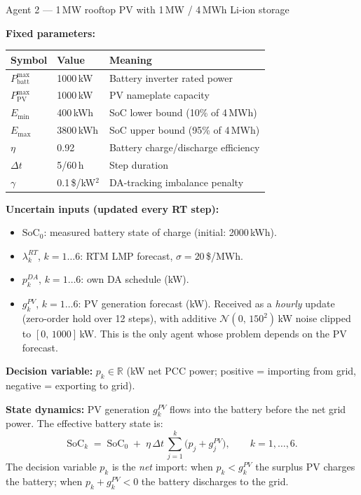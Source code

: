 \documentclass[11pt, letterpaper]{article}
\newcommand{\Dt}{\Delta t}
\begin{document}
\begin{agentbox}{Agent 2 — 1\,MW rooftop PV with 1\,MW / 4\,MWh Li-ion storage}

\textbf{Fixed parameters:}
\begin{center}
\small
\begin{tabular}{lll}
\toprule
Symbol & Value & Meaning \\
\midrule
$P^{\max}_{\text{batt}}$ & 1000\,kW & Battery inverter rated power \\
$P^{\max}_{\text{PV}}$   & 1000\,kW & PV nameplate capacity \\
$E_{\min}$ & 400\,kWh  & SoC lower bound (10\% of 4\,MWh) \\
$E_{\max}$ & 3800\,kWh & SoC upper bound (95\% of 4\,MWh) \\
$\eta$     & 0.92      & Battery charge/discharge efficiency \\
$\Dt$      & 5/60\,h   & Step duration \\
$\gamma$   & 0.1\,\$/kW$^2$ & DA-tracking imbalance penalty \\
\bottomrule
\end{tabular}
\end{center}

\textbf{Uncertain inputs (updated every RT step):}
\begin{itemize}[nosep]
  \item $\text{SoC}_0$: measured battery state of charge (initial: 2000\,kWh).
  \item $\lambda^{RT}_k$, $k=1\ldots6$: RTM LMP forecast, $\sigma = 20$\,\$/MWh.
  \item $p^{DA}_k$, $k=1\ldots6$: own DA schedule (kW).
  \item $g^{PV}_k$, $k=1\ldots6$: PV generation forecast (kW).
        Received as a \emph{hourly} update (zero-order hold over 12 steps), with additive $\mathcal{N}(0,\,150^2)$\,kW noise clipped to $[0,\,1000]$\,kW.
        This is the only agent whose problem depends on the PV forecast.
\end{itemize}

\textbf{Decision variable:} $p_k \in \mathbb{R}$ (kW net PCC power; positive = importing from grid, negative = exporting to grid).

\textbf{State dynamics:}
PV generation $g^{PV}_k$ flows into the battery before the net grid power.  The effective battery state is:
\[
\text{SoC}_k \;=\; \text{SoC}_0 \;+\; \eta\,\Dt\,\sum_{j=1}^{k}\bigl(p_j + g^{PV}_j\bigr), \qquad k = 1,\ldots,6.
\]
The decision variable $p_k$ is the \emph{net} import: when $p_k < g^{PV}_k$ the surplus PV charges the battery; when $p_k + g^{PV}_k < 0$ the battery discharges to the grid.


\end{agentbox}
\end{document}
